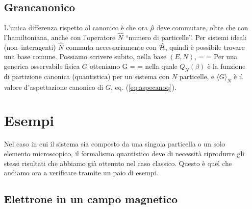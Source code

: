 \subsection{Grancanonico}

L'unica differenza rispetto al canonico è che ora $\hat\rho$ deve commutare, oltre che con l'hamiltoniana, anche con l'operatore $\hat N$ ``numero di particelle''. Per sistemi ideali (non--interagenti) $\hat N$ commuta necessariamente con $\hat{\mathcal H}$, quindi è possibile trovare una base comune. Possiamo scrivere subito, nella base $(E,N)$,
\be
\rhop = 
= 
\ee
Per una generica osservabile fisica $G$ otteniamo
\be
\langle G \rangle = 
= 
\ee
nella quale $Q_N(\beta)$ è la funzione di partizione canonica (quantistica) per un sistema con $N$ particelle, e $\langle G \rangle_N$ è il valore d'aspettazione canonico di $G$, eq. (\ref{eq:aspecanoq}).

\section{Esempi}

Nel caso in cui il sistema sia composto da una singola particella o un solo elemento microscopico, il formalismo quantistico deve di necessità riprodurre gli stessi risultati che abbiamo già ottenuto nel caso classico. Questo è quel che andiamo ora a verificare tramite un paio di esempi.

\subsection{Elettrone in un campo magnetico}

